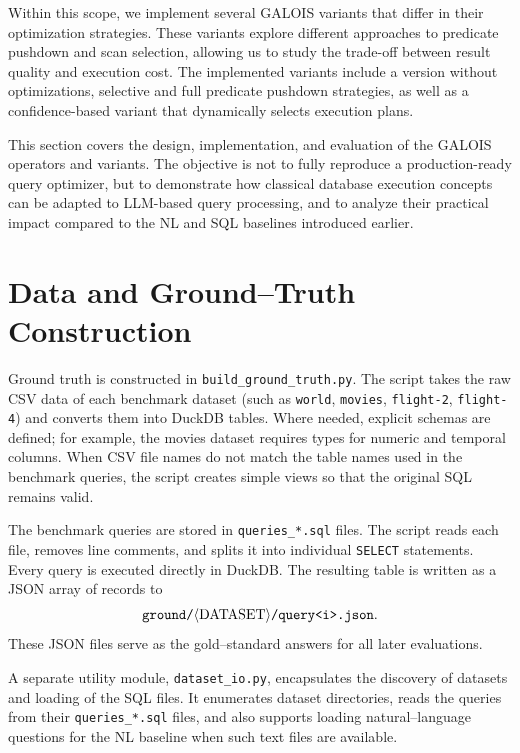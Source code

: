 \documentclass[11pt]{article}
\begin{document}
Within this scope, we implement several GALOIS variants that differ in their optimization strategies. These variants explore different approaches to predicate pushdown and scan selection, allowing us to study the trade-off between result quality and execution cost. The implemented variants include a version without optimizations, selective and full predicate pushdown strategies, as well as a confidence-based variant that dynamically selects execution plans.

This section covers the design, implementation, and evaluation of the GALOIS operators and variants. The objective is not to fully reproduce a production-ready query optimizer, but to demonstrate how classical database execution concepts can be adapted to LLM-based query processing, and to analyze their practical impact compared to the NL and SQL baselines introduced earlier.

\clearpage
\section{Data and Ground–Truth Construction}

Ground truth is constructed in \texttt{build\_ground\_truth.py}. The script takes the raw CSV data of each benchmark dataset (such as \texttt{world}, \texttt{movies}, \texttt{flight-2}, \texttt{flight-4}) and converts them into DuckDB tables. Where needed, explicit schemas are defined; for example, the movies dataset requires types for numeric and temporal columns. When CSV file names do not match the table names used in the benchmark queries, the script creates simple views so that the original SQL remains valid.

The benchmark queries are stored in \texttt{queries\_*.sql} files. The script reads each file, removes line comments, and splits it into individual \texttt{SELECT} statements. Every query is executed directly in DuckDB. The resulting table is written as a JSON array of records to
\[
  \texttt{ground/}\langle\text{DATASET}\rangle\texttt{/query\textless i\textgreater.json}.
\]
These JSON files serve as the gold–standard answers for all later evaluations.

A separate utility module, \texttt{dataset\_io.py}, encapsulates the discovery of datasets and loading of the SQL files. It enumerates dataset directories, reads the queries from their \texttt{queries\_*.sql} files, and also supports loading natural–language questions for the NL baseline when such text files are available.
\end{document}
